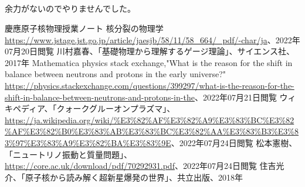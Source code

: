 \documentclass[dvipdfmx]{jsarticle}
\begin{document}
\subsection{}
余力がないのでやりませんでした。
\begin{thebibliography}{99}
	 慶應原子核物理授業ノート
	核分裂の物理学\url{https://www.jstage.jst.go.jp/article/jaesjb/58/11/58_664/_pdf/-char/ja}、2022年07月20日閲覧
	 川村嘉春、「基礎物理から理解するゲージ理論」、サイエンス社、2017年
	 Mathematica
	physics stack exchange,"What is the reason for the shift in balance between neutrons and protons in the early universe?" 
	\url{https://physics.stackexchange.com/questions/399297/what-is-the-reason-for-the-shift-in-balance-between-neutrons-and-protons-in-the}、2022年07月21日閲覧
	ウィキペディア、「クォークグルーオンプラズマ」、\url{https://ja.wikipedia.org/wiki/%E3%82%AF%E3%82%A9%E3%83%BC%E3%82%AF%E3%82%B0%E3%83%AB%E3%83%BC%E3%82%AA%E3%83%B3%E3%83%97%E3%83%A9%E3%82%BA%E3%83%9E}、2022年07月24日閲覧
	松本憲樹、「ニュートリノ振動と質量問題」、\url{https://core.ac.uk/download/pdf/70292931.pdf}、2022年07月24日閲覧
	住吉光介、「原子核から読み解く超新星爆発の世界」、共立出版、2018年

\end{thebibliography}
\end{document}

